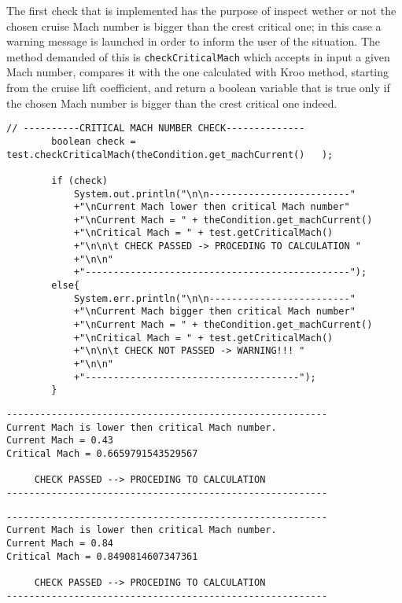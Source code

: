 \bigskip
The first check that is implemented has the purpose of inspect wether or not the chosen cruise Mach number is bigger than the crest critical one; in this case a warning message is launched in order to inform the user of the situation. The method demanded of this is \lstinline[language=Java]!checkCriticalMach! which accepts in input a given Mach number, compares it with the one calculated with Kroo method, starting from the cruise lift coefficient, and return a boolean variable that is true only if the chosen Mach number is bigger than the crest critical one indeed. 

\bigskip
\begin{lstlisting}[caption={Excerpt of the ATR-72 Payload-Range test - critical Mach number check}, captionpos=b, tabsize=2]
		// ----------CRITICAL MACH NUMBER CHECK--------------
		boolean check = test.checkCriticalMach(theCondition.get_machCurrent()	);
		
		if (check)
			System.out.println("\n\n-------------------------"
			+"\nCurrent Mach lower then critical Mach number"
			+"\nCurrent Mach = " + theCondition.get_machCurrent() 
			+"\nCritical Mach = " + test.getCriticalMach() 
			+"\n\n\t CHECK PASSED -> PROCEDING TO CALCULATION "
			+"\n\n"
			+"-----------------------------------------------");
		else{
			System.err.println("\n\n-------------------------"
			+"\nCurrent Mach bigger then critical Mach number"
			+"\nCurrent Mach = " + theCondition.get_machCurrent() 
			+"\nCritical Mach = " + test.getCriticalMach() 
			+"\n\n\t CHECK NOT PASSED -> WARNING!!! "
			+"\n\n"
			+"--------------------------------------");
		}
\end{lstlisting}

\bigskip
\begin{lstlisting}[caption={Excerpt of the ATR-72 Payload-Range test results - critical Mach number check}, captionpos=b, tabsize=2]
---------------------------------------------------------
Current Mach is lower then critical Mach number.
Current Mach = 0.43
Critical Mach = 0.6659791543529567

	 CHECK PASSED --> PROCEDING TO CALCULATION 
---------------------------------------------------------
\end{lstlisting}

\bigskip
\begin{lstlisting}[caption={Excerpt of the B747-100B Payload-Range test results - critical Mach number check}, captionpos=b, tabsize=2]
---------------------------------------------------------
Current Mach is lower then critical Mach number.
Current Mach = 0.84
Critical Mach = 0.8490814607347361

	 CHECK PASSED --> PROCEDING TO CALCULATION 
---------------------------------------------------------
\end{lstlisting}


